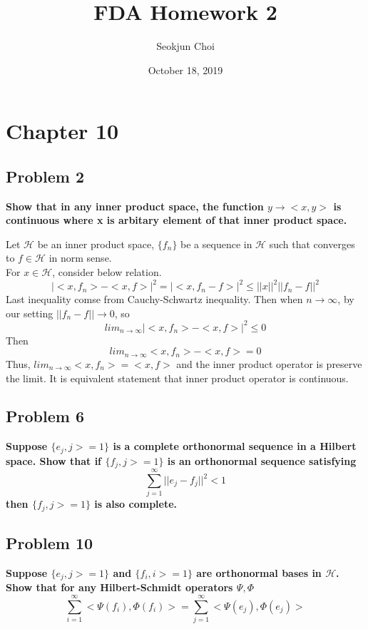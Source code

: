 \documentclass{article}
\begin{document}
\title{FDA Homework 2}
\author{Seokjun Choi}
\date{October 18, 2019}
\maketitle

\section{Chapter 10}
\subsection{Problem 2}

\textbf{
Show that in any inner product space, the function $y\rightarrow<x,y>$ is continuous where x is arbitary element of that inner product space.
}

Let $\mathcal{H}$ be an inner product space, \(\{f_n\}\) be a sequence in $\mathcal{H}$
such that converges to $f\in\mathcal{H}$ in norm sense. \\
For $x\in\mathcal{H}$, consider below relation.
\[|<x, f_n>-<x,f>|^2 = |<x, f_n-f>|^2 \leq ||x||^2||f_n-f||^2\]
Last inequality comse from Cauchy-Schwartz inequality. Then when $n\rightarrow\infty$, by our setting $||f_n-f||\rightarrow0$, so
\[lim_{n\rightarrow\infty}|<x, f_n>-<x,f>|^2\leq 0\]
Then
\[lim_{n\rightarrow\infty}<x, f_n>-<x,f>= 0\]
Thus, \(lim_{n\rightarrow\infty}<x, f_n> = <x,f>\) and the inner product operator is preserve the limit.
It is equivalent statement that inner product operator is continuous.


\subsection{Problem 6}
\textbf{
    Suppose $\{e_j,j>=1\}$ is a complete orthonormal sequence in a Hilbert space. 
    Show that if $\{f_j,j>=1\}$ is an orthonormal sequence satisfying
    \[\sum_{j=1}^\infty ||e_j-f_j||^2<1\]
    then $\{f_j,j>=1\}$ is also complete.
}

\subsection{Problem 10}
\textbf{
    Suppose $\{e_j,j>=1\}$ and $\{f_i,i>=1\}$ are orthonormal bases in $\mathcal{H}$.
    Show that for any Hilbert-Schmidt operators $\Psi,\Phi$
    \[\sum_{i=1}^{\infty} <\Psi(f_i), \Phi(f_i)> = \sum_{j=1}^{\infty} <\Psi(e_j),\Phi(e_j)>\]
}
\end{document}

